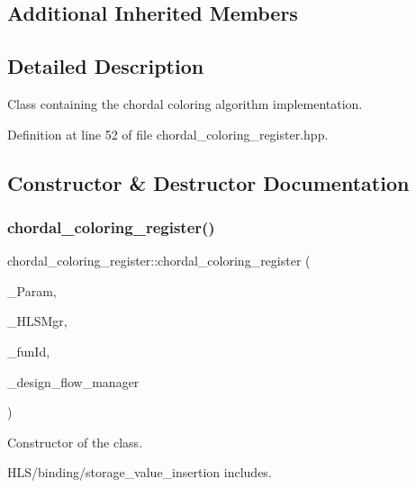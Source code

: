 \subsection*{Additional Inherited Members}


\subsection{Detailed Description}
Class containing the chordal coloring algorithm implementation. 

Definition at line 52 of file chordal\+\_\+coloring\+\_\+register.\+hpp.



\subsection{Constructor \& Destructor Documentation}
\mbox{\label{classchordal__coloring__register_a39b63e92e57d05feaab4dd0363aa2e2f}} 
\subsubsection{\texorpdfstring{chordal\+\_\+coloring\+\_\+register()}{chordal\_coloring\_register()}}
{\footnotesize\ttfamily chordal\+\_\+coloring\+\_\+register\+::chordal\+\_\+coloring\+\_\+register (\begin{DoxyParamCaption}\item[{const \hyperlink{Parameter_8hpp_a37841774a6fcb479b597fdf8955eb4ea}{Parameter\+Const\+Ref}}]{\+\_\+\+Param,  }\item[{const \hyperlink{hls__manager_8hpp_acd3842b8589fe52c08fc0b2fcc813bfe}{H\+L\+S\+\_\+manager\+Ref}}]{\+\_\+\+H\+L\+S\+Mgr,  }\item[{unsigned int}]{\+\_\+fun\+Id,  }\item[{const Design\+Flow\+Manager\+Const\+Ref}]{\+\_\+design\+\_\+flow\+\_\+manager }\end{DoxyParamCaption})}



Constructor of the class. 

H\+L\+S/binding/storage\+\_\+value\+\_\+insertion includes.



